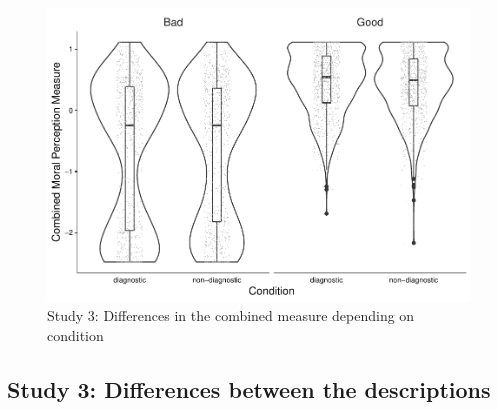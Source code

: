 \documentclass[
  american,
  man,mask,floatsintext]{apa6}
\begin{document}
\begin{figure}[!h]
\includegraphics[width=\textwidth,]{Supplementary_files/figure-latex/S3combinedplot-1} \caption{Study 3: Differences in the combined measure depending on condition}\label{fig:S3combinedplot}
\end{figure}

\newpage

\hypertarget{study-3-differences-between-the-descriptions}{%
\subsection{Study 3: Differences between the descriptions}\label{study-3-differences-between-the-descriptions}}

\newpage
\end{document}
